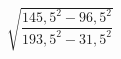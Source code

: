 \begin{ex}[type=calculate]
	\begin{condition}
		\( \sqrt{\dfrac{145,5^2-96,5^2}{193,5^2-31,5^2}} \)
	\end{condition}
\end{ex}